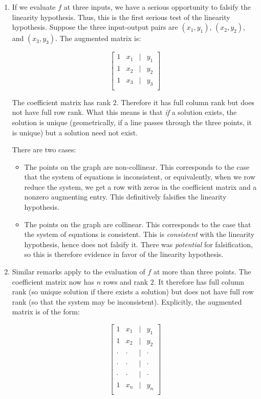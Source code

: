\documentclass[10pt]{amsart}
\begin{document}
\begin{enumerate}
\item If we evaluate $f$ at three inputs, we have a serious
  opportunity to falsify the linearity hypothesis. Thus, this is the
  first serious test of the linearity hypothesis. Suppose the three
  input-output pairs are $(x_1,y_1)$, $(x_2,y_2)$, and
  $(x_3,y_3)$. The augmented matrix is:

  $$\left[\begin{matrix} 1 & x_1 & \mid & y_1 \\ 1 & x_2 & \mid & y_2 \\ 1 & x_3 & \mid & y_3 \\\end{matrix}\right]$$

  The coefficient matrix has rank $2$. Therefore it has full column
  rank but does not have full row rank. What this means is that {\em
    if} a solution exists, the solution is unique (geometrically, if a
  line passes through the three points, it is unique) but a solution
  need not exist.

  There are two cases:

  \begin{itemize}
  \item The points on the graph are non-collinear. This corresponds to
    the case that the system of equations is inconsistent, or
    equivalently, when we row reduce the system, we get a row with
    zeros in the coefficient matrix and a nonzero augmenting
    entry. This definitively falsifies the linearity hypothesis.
  \item The points on the graph are collinear. This corresponds to the
    case that the system of equations is consistent. This is {\em
      consistent} with the linearity hypothesis, hence does not
    falsify it. There was {\em potential} for falsification, so this
    is therefore evidence in favor of the linearity hypothesis.
  \end{itemize}
\item Similar remarks apply to the evaluation of $f$ at more than
  three points. The coefficient matrix now has $n$ rows and rank
  $2$. It therefore has full column rank (so unique solution if there
  exists a solution) but does not have full row rank (so that the
  system may be inconsistent). Explicitly, the augmented matrix is of
  the form:

  $$\left[ \begin{matrix} 1 & x_1 & \mid & y_1 \\ 1 & x_2 & \mid & y_2 \\ \cdot & \cdot & \mid & \cdot \\  \cdot & \cdot & \mid & \cdot \\  \cdot & \cdot & \mid & \cdot \\ 1 & x_n & \mid & y_n \\\end{matrix}\right]$$


\end{enumerate}
\end{document}
